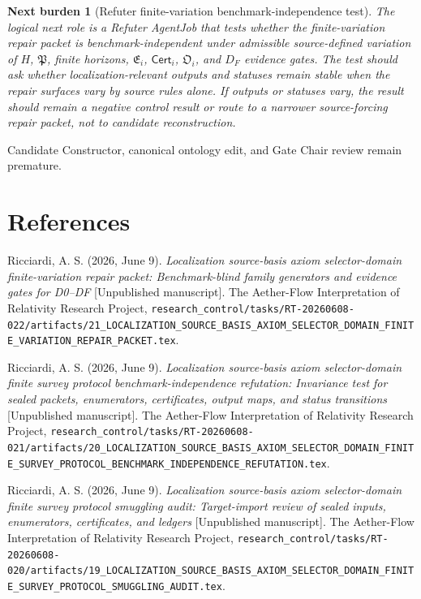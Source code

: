 \documentclass[11pt]{article}
\newcommand{\PackFam}{\mathfrak{P}}
\newcommand{\EnumFam}{\mathfrak{E}}
\newcommand{\Cert}{\mathsf{Cert}}
\newcommand{\OutFam}{\mathfrak{O}}
\newtheorem{nextburden}{Next burden}
\begin{document}
\begin{nextburden}[Refuter finite-variation benchmark-independence test]
The logical next role is a Refuter AgentJob that tests whether the
finite-variation repair packet is benchmark-independent under admissible
source-defined variation of \(H\), \(\PackFam\), finite horizons,
\(\EnumFam_i\), \(\Cert_i\), \(\OutFam_i\), and \(D_F\) evidence gates. The
test should ask whether localization-relevant outputs and statuses remain
stable when the repair surfaces vary by source rules alone. If outputs or
statuses vary, the result should remain a negative control result or route to
a narrower source-forcing repair packet, not to candidate reconstruction.
\end{nextburden}

Candidate Constructor, canonical ontology edit, and Gate Chair review remain
premature.

\section*{References}

Ricciardi, A. S. (2026, June 9). \emph{Localization source-basis axiom
selector-domain finite-variation repair packet: Benchmark-blind family
generators and evidence gates for D0--DF} [Unpublished manuscript]. The
Aether-Flow Interpretation of Relativity Research Project,
\texttt{research\_control/tasks/RT-20260608-022/artifacts/21\_LOCALIZATION\_SOURCE\_BASIS\_AXIOM\_SELECTOR\_DOMAIN\_FINITE\_VARIATION\_REPAIR\_PACKET.tex}.

Ricciardi, A. S. (2026, June 9). \emph{Localization source-basis axiom
selector-domain finite survey protocol benchmark-independence refutation:
Invariance test for sealed packets, enumerators, certificates, output maps,
and status transitions} [Unpublished manuscript]. The Aether-Flow
Interpretation of Relativity Research Project,
\texttt{research\_control/tasks/RT-20260608-021/artifacts/20\_LOCALIZATION\_SOURCE\_BASIS\_AXIOM\_SELECTOR\_DOMAIN\_FINITE\_SURVEY\_PROTOCOL\_BENCHMARK\_INDEPENDENCE\_REFUTATION.tex}.

Ricciardi, A. S. (2026, June 9). \emph{Localization source-basis axiom
selector-domain finite survey protocol smuggling audit: Target-import review
of sealed inputs, enumerators, certificates, and ledgers} [Unpublished
manuscript]. The Aether-Flow Interpretation of Relativity Research Project,
\texttt{research\_control/tasks/RT-20260608-020/artifacts/19\_LOCALIZATION\_SOURCE\_BASIS\_AXIOM\_SELECTOR\_DOMAIN\_FINITE\_SURVEY\_PROTOCOL\_SMUGGLING\_AUDIT.tex}.
\end{document}
